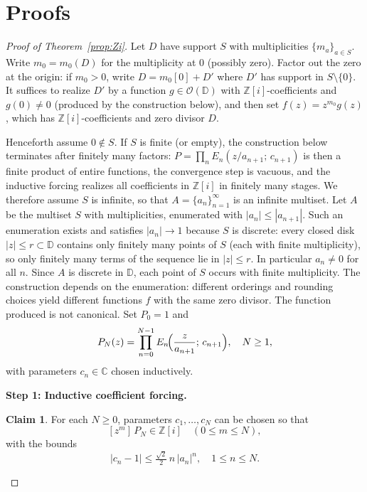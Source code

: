 \documentclass{amsart}
\theoremstyle{definition}
\newtheorem{claim}[theorem]{Claim}
\newcommand{\D}{\mathbb{D}}
\newcommand{\Zi}{\mathbb{Z}[i]}
\newcommand{\C}{\mathbb{C}}
\newcommand{\abs}[1]{\left|#1\right|}
\newcommand{\OD}{\mathcal{O}(\D)}
\begin{document}
\section{Proofs}
\label{sec:proofs}

\begin{proof}[Proof of Theorem~\ref{prop:Zi}]
Let $D$ have support $S$ with multiplicities $\{m_a\}_{a \in S}$.
Write $m_0 = m_0(D)$ for the multiplicity at $0$ (possibly zero).
Factor out the zero at the origin: if $m_0 > 0$, write $D = m_0[0] + D'$
where $D'$ has support in $S \setminus \{0\}$.  It suffices to realize
$D'$ by a function $g \in \OD$ with $\Zi$-coefficients and $g(0) \neq 0$
(produced by the construction below), and then set $f(z) = z^{m_0}g(z)$,
which has $\Zi$-coefficients and zero divisor $D$.

Henceforth assume $0 \notin S$.  If $S$ is finite (or empty), the
construction below terminates after finitely many factors: $P = \prod_{n}
E_n(z/a_{n+1};\,c_{n+1})$ is then a finite product of entire functions,
the convergence step is vacuous, and the inductive forcing realizes all
coefficients in $\Zi$ in finitely many stages.  We therefore assume $S$
is infinite, so that $A = \{a_n\}_{n=1}^\infty$ is an infinite multiset.
Let $A$ be the
multiset $S$ with multiplicities, enumerated with $\abs{a_n} \leq
\abs{a_{n+1}}$.  Such an enumeration exists and satisfies $\abs{a_n} \to 1$
because $S$ is discrete: every closed disk $\abs{z} \leq r \subset \D$
contains only finitely many points of $S$ (each with finite
multiplicity), so only finitely many terms of the sequence lie in
$\abs{z} \leq r$.  In particular $a_n \neq 0$ for all $n$.
Since $A$ is discrete in $\D$, each point of $S$ occurs with finite
multiplicity.  The construction depends on the enumeration: different
orderings and rounding choices yield different functions $f$ with the
same zero divisor.  The function produced is not canonical.
Set $P_0 = 1$ and
\[
  P_{N}(z) = \prod_{n=0}^{N-1}
  E_n\!\Bigl(\frac{z}{a_{n+1}};\,c_{n+1}\Bigr), \quad N \geq 1,
\]
with parameters $c_n \in \C$ chosen inductively.

\medskip\noindent\textbf{Step 1: Inductive coefficient forcing.}

\begin{claim}
For each $N \geq 0$, parameters $c_1,\ldots,c_N$ can be chosen so that
\begin{equation}
\label{eq:indhyp}
  [z^m]\,P_N \in \Zi \quad (0 \leq m \leq N),
\end{equation}
with the bounds
\begin{equation}
\label{eq:cnbound}
  \abs{c_{n} - 1} \leq \tfrac{\sqrt{2}}{2}\,n\,\abs{a_{n}}^{n},
  \quad 1 \leq n \leq N.
\end{equation}
\end{claim}


\end{proof}
\end{document}
